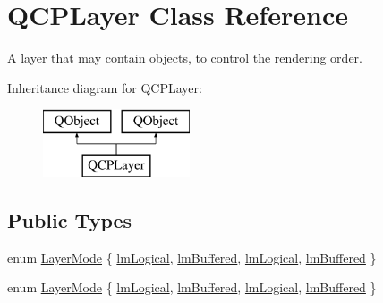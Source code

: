 \hypertarget{class_q_c_p_layer}{}\section{Q\+C\+P\+Layer Class Reference}
\label{class_q_c_p_layer}


A layer that may contain objects, to control the rendering order.  


Inheritance diagram for Q\+C\+P\+Layer\+:\begin{figure}[H]
\begin{center}
\leavevmode
\includegraphics[height=2.000000cm]{class_q_c_p_layer}
\end{center}
\end{figure}
\subsection*{Public Types}
\begin{DoxyCompactItemize}
\item 
enum \hyperlink{class_q_c_p_layer_a67dcfc1590be2a1f2227c5a39bb59c7c}{Layer\+Mode} \{ \hyperlink{class_q_c_p_layer_a67dcfc1590be2a1f2227c5a39bb59c7ca6294b5ed9040aede762c626f5108f934}{lm\+Logical}, 
\hyperlink{class_q_c_p_layer_a67dcfc1590be2a1f2227c5a39bb59c7cada274b1644a2a3c1b794c052f1601bb2}{lm\+Buffered}, 
\hyperlink{class_q_c_p_layer_a67dcfc1590be2a1f2227c5a39bb59c7ca6294b5ed9040aede762c626f5108f934}{lm\+Logical}, 
\hyperlink{class_q_c_p_layer_a67dcfc1590be2a1f2227c5a39bb59c7cada274b1644a2a3c1b794c052f1601bb2}{lm\+Buffered}
 \}
\item 
enum \hyperlink{class_q_c_p_layer_a67dcfc1590be2a1f2227c5a39bb59c7c}{Layer\+Mode} \{ \hyperlink{class_q_c_p_layer_a67dcfc1590be2a1f2227c5a39bb59c7ca6294b5ed9040aede762c626f5108f934}{lm\+Logical}, 
\hyperlink{class_q_c_p_layer_a67dcfc1590be2a1f2227c5a39bb59c7cada274b1644a2a3c1b794c052f1601bb2}{lm\+Buffered}, 
\hyperlink{class_q_c_p_layer_a67dcfc1590be2a1f2227c5a39bb59c7ca6294b5ed9040aede762c626f5108f934}{lm\+Logical}, 
\hyperlink{class_q_c_p_layer_a67dcfc1590be2a1f2227c5a39bb59c7cada274b1644a2a3c1b794c052f1601bb2}{lm\+Buffered}
 \}
\end{DoxyCompactItemize}
